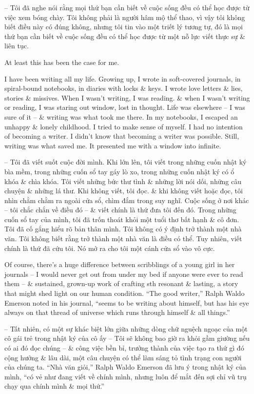 \documentclass{article}
\begin{document}
\begin{itemize}
	-- Tôi đã nghe nói rằng mọi thứ bạn cần biết về cuộc sống đều có thể học được từ việc xem bóng chày. Tôi không phải là người hâm mộ thể thao, vì vậy tôi không biết điều này có đúng không, nhưng tôi tin vào một triết lý tương tự, đó là mọi thứ bạn cần biết về cuộc sống đều có thể học được từ một nỗ lực viết thực sự \& liên tục.
	
	At least this has been the case for me.
	
	I have been writing all my life. Growing up, I wrote in soft-covered journals, in spiral-bound notebooks, in diaries with locks \& keys. I wrote love letters \& lies, stories \& missives. When I wasn't writing, I was reading. \& when I wasn't writing or reading, I was staring out window, lost in thought. Life was elsewhere -- I was sure of it -- \& writing was what took me there. In my notebooks, I escaped an unhappy \& lonely childhood. I tried to make sense of myself. I had no intention of becoming a writer. I didn't know that becoming a writer was possible. Still, writing was what saved me. It presented me with a window into infinite. 
	
	-- Tôi đã viết suốt cuộc đời mình. Khi lớn lên, tôi viết trong những cuốn nhật ký bìa mềm, trong những cuốn sổ tay gáy lò xo, trong những cuốn nhật ký có ổ khóa \& chìa khóa. Tôi viết những bức thư tình \& những lời nói dối, những câu chuyện \& những lá thư. Khi không viết, tôi đọc. \& khi không viết hoặc đọc, tôi nhìn chằm chằm ra ngoài cửa sổ, chìm đắm trong suy nghĩ. Cuộc sống ở nơi khác -- tôi chắc chắn về điều đó -- \& viết chính là thứ đưa tôi đến đó. Trong những cuốn sổ tay của mình, tôi đã trốn thoát khỏi một tuổi thơ bất hạnh \& cô đơn. Tôi đã cố gắng hiểu rõ bản thân mình. Tôi không có ý định trở thành một nhà văn. Tôi không biết rằng trở thành một nhà văn là điều có thể. Tuy nhiên, viết chính là thứ đã cứu tôi. Nó mở ra cho tôi một cánh cửa sổ vào vô cực. 
	
	Of course, there's a huge difference between scribblings of a young girl in her journals -- I would never get out from under my bed if anyone were ever to read them -- \& sustained, grown-up work of crafting sth resonant \& lasting, a story that might shed light on our human condition. ``The good writer,'' {\sc Ralph Waldo Emerson} noted in his journal, ``seems to be writing about himself, but has his eye always on that thread of universe which runs through himself \& all things.''
	
	-- Tất nhiên, có một sự khác biệt lớn giữa những dòng chữ nguệch ngoạc của một cô gái trẻ trong nhật ký của cô ấy -- Tôi sẽ không bao giờ ra khỏi gầm giường nếu có ai đó đọc chúng -- \& công việc bền bỉ, trưởng thành của việc tạo ra thứ gì đó cộng hưởng \& lâu dài, một câu chuyện có thể làm sáng tỏ tình trạng con người của chúng ta. ``Nhà văn giỏi,'' {\sc Ralph Waldo Emerson} đã lưu ý trong nhật ký của mình, ``có vẻ như đang viết về chính mình, nhưng luôn để mắt đến sợi chỉ vũ trụ chạy qua chính mình \& mọi thứ.''
	

\end{itemize}
\end{document}
